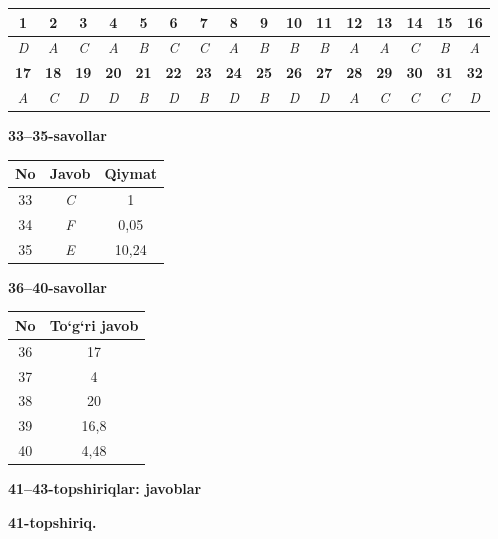 \documentclass[11pt,a4paper]{article}
\begin{document}
\noindent\begin{tabular}{|c|c|c|c|c|c|c|c|c|c|c|c|c|c|c|c|}\hline
\textbf{1} & \textbf{2} & \textbf{3} & \textbf{4} & \textbf{5} & \textbf{6} & \textbf{7} & \textbf{8} & \textbf{9} & \textbf{10} & \textbf{11} & \textbf{12} & \textbf{13} & \textbf{14} & \textbf{15} & \textbf{16}\\\hline
\textsl{D} & \textsl{A} & \textsl{C} & \textsl{A} & \textsl{B} & \textsl{C} & \textsl{C} & \textsl{A} & \textsl{B} & \textsl{B} & \textsl{B} & \textsl{A} & \textsl{A} & \textsl{C} & \textsl{B} & \textsl{A}\\\hline
\textbf{17} & \textbf{18} & \textbf{19} & \textbf{20} & \textbf{21} & \textbf{22} & \textbf{23} & \textbf{24} & \textbf{25} & \textbf{26} & \textbf{27} & \textbf{28} & \textbf{29} & \textbf{30} & \textbf{31} & \textbf{32}\\\hline
\textsl{A} & \textsl{C} & \textsl{D} & \textsl{D} & \textsl{B} & \textsl{D} & \textsl{B} & \textsl{D} & \textsl{B} & \textsl{D} & \textsl{D} & \textsl{A} & \textsl{C} & \textsl{C} & \textsl{C} & \textsl{D}\\\hline
\end{tabular}\par\medskip
\noindent\textbf{33--35-savollar}\par\smallskip
\noindent\begin{tabular}{|c|c|c|}\hline \textbf{No} & \textbf{Javob} & \textbf{Qiymat}\\\hline
33 & \textsl{C} & 1\\\hline
34 & \textsl{F} & 0,05\\\hline
35 & \textsl{E} & 10,24\\\hline
\end{tabular}\par\medskip
\noindent\textbf{36--40-savollar}\par\smallskip
\noindent\begin{tabular}{|c|c|}\hline \textbf{No} & \textbf{To`g`ri javob}\\\hline
36 & 17\\\hline
37 & 4\\\hline
38 & 20\\\hline
39 & 16,8\\\hline
40 & 4,48\\\hline
\end{tabular}\par\medskip
\noindent\textbf{41--43-topshiriqlar: javoblar}\par\smallskip
\noindent\textbf{41-topshiriq.}\par
\end{document}
